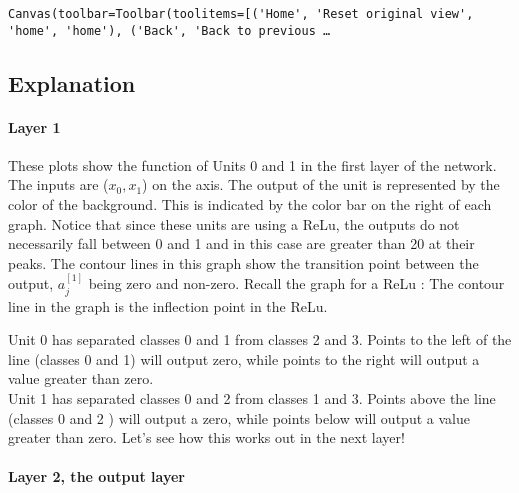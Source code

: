 \documentclass[11pt]{article}
\begin{document}
    
    \begin{verbatim}
Canvas(toolbar=Toolbar(toolitems=[('Home', 'Reset original view', 'home', 'home'), ('Back', 'Back to previous …
    \end{verbatim}

    
    \hypertarget{explanation}{%
\subsection{Explanation}\label{explanation}}

\hypertarget{layer-1}{%
\paragraph{\texorpdfstring{Layer 1 }{Layer 1 }}\label{layer-1}}

These plots show the function of Units 0 and 1 in the first layer of the
network. The inputs are (\(x_0,x_1\)) on the axis. The output of the
unit is represented by the color of the background. This is indicated by
the color bar on the right of each graph. Notice that since these units
are using a ReLu, the outputs do not necessarily fall between 0 and 1
and in this case are greater than 20 at their peaks. The contour lines
in this graph show the transition point between the output,
\(a^{[1]}_j\) being zero and non-zero. Recall the graph for a ReLu : The
contour line in the graph is the inflection point in the ReLu.

Unit 0 has separated classes 0 and 1 from classes 2 and 3. Points to the
left of the line (classes 0 and 1) will output zero, while points to the
right will output a value greater than zero.\\
Unit 1 has separated classes 0 and 2 from classes 1 and 3. Points above
the line (classes 0 and 2 ) will output a zero, while points below will
output a value greater than zero. Let's see how this works out in the
next layer!

    \hypertarget{layer-2-the-output-layer}{%
\paragraph{\texorpdfstring{Layer 2, the output layer
}{Layer 2, the output layer }}\label{layer-2-the-output-layer}}
\end{document}
